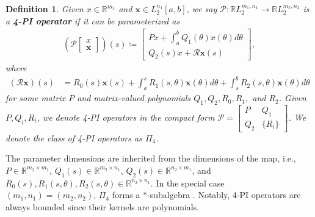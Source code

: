 \documentclass[letterpaper, 10 pt, conference]{ieeeconf}
\newtheorem{definition}{Definition}
\newcommand{\R}{\mathbb{R}}
\newcommand{\mcl}[1]{\mathcal{#1}}
\newcommand{\mbf}[1]{\mathbf{#1}}
\theoremstyle{definition}
\begin{document}
\begin{definition}
Given $x \in \mathbb{R}^{m_1}$ and $\mathbf{x} \in L_2^{n_1}[a,b]$, we say $\mathcal{P}:\R L_2^{m_1,n_1}\to \R L_2^{m_2,n_2}$ is a \textbf{4-PI operator} if it can be parameterized as \begin{align}
\left(\mcl P \begin{bmatrix}
    x\\ \mathbf{x}
\end{bmatrix}\right)(s) \coloneqq \begin{bmatrix}
    Px + \int_a^b{Q_1(\theta)x(\theta) d \theta }\\
    Q_2(s)x + \mathcal{R}\mathbf {x}(s)\nonumber
\end{bmatrix},\end{align}
where
\begin{align}
    (\mathcal{R}\mathbf{x})(s)\!\!&=\!\!R_0(s)\mathbf{x}(s) \!+\!\! \int_a^s\!\!{R_1(s,\theta)\mbf{x}(\theta)d\theta}\!+\!\!\int_s^b\!\!{R_2(s,\theta)\mathbf{x}(\theta)d\theta}\nonumber
\end{align}
for some matrix $P$ and matrix-valued polynomials $Q_1, Q_2, R_0, R_1,$ and $R_2$. Given $P,Q_i,R_i$, we denote 4-PI operators in the compact form
$\mcl P= \left[ \begin{array}{c|c}
P & Q_1 \\
\hline
Q_2 & \{R_i\}
\end{array} \right]$.
We denote the class of 4-PI operators as $\Pi_4$. %
\end{definition}
The parameter dimensions are inherited from the dimensions of the map, i.e., $P \in \mathbb{R}^{m_2 \times m_1}$, $Q_1(s) \in \mathbb{R}^{m_2 \times n_1}$, $Q_2(s)\in \mathbb{R}^{n_2\times m_1}$, and $R_0(s), R_1(s,\theta), R_2(s,\theta) \in \mathbb{R}^{n_2 \times n_1}$. In the special case $(m_1,n_1) = (m_2,n_2)$, $\Pi_4$ forms a $*$-subalgebra \cite{shivakumar_extension_2024}. Notably, 4-PI operators are always bounded since their kernels are polynomials.  
\end{document}
